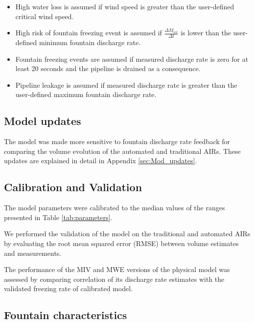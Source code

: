 \documentclass[tc, manuscript]{copernicus}
\begin{document}
\begin{itemize}

\item High water loss is assumed if wind speed is greater than the user-defined critical wind speed.

\item High risk of fountain freezing event is assumed if $\frac{\Delta M_{ice}}{\Delta t}$ is lower than the user-defined minimum fountain discharge rate. 

\item Fountain freezing events are assumed if measured discharge rate is zero for at least 20 seconds and the pipeline is drained as a
  consequence.

\item Pipeline leakage is assumed if measured discharge rate is greater than the user-defined maximum fountain discharge rate.

\end{itemize}

\subsection{Model updates}
The model was made more sensitive to fountain discharge rate feedback for comparing the volume evolution of the
automated and traditional AIRs. These updates are explained in detail in Appendix \ref{sec:Mod_updates}.

\subsection{Calibration and Validation}

The model parameters were calibrated to the median values of the ranges presented in Table \ref{tab:parameters}.

We performed the validation of the model on the traditional and automated AIRs by evaluating the root mean
squared error (RMSE) between volume estimates and measurements. 

The performance of the MIV and MWE versions of the physical model was assessed by comparing correlation of its
discharge rate estimates with the validated freezing rate of calibrated model.

\subsection{Fountain characteristics}
\end{document}
